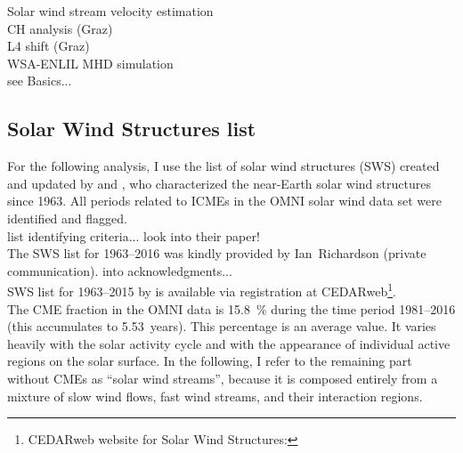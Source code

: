 Solar wind stream velocity estimation\\
CH analysis (Graz)\\
L4 shift (Graz)\\
WSA-ENLIL MHD simulation\\
see Basics...\\

\subsection{Solar Wind Structures list}
For the following analysis, I use the list of solar wind structures (SWS) created and updated by \citet{Richardson2000} and \citet{Richardson2012}, who characterized the near-Earth solar wind structures since 1963. All periods related to ICMEs in the OMNI solar wind data set were identified and flagged.\\

list identifying criteria... look into their paper!\\

The SWS list for 1963--2016 was kindly provided by Ian~Richardson (private communication). into acknowledgments...\\

SWS list for 1963--2015 by \citep{Richardson2000,Richardson2012} is available via registration at CEDARweb\footnote{CEDARweb website for Solar Wind Structures: }.\\

The CME fraction in the OMNI data is \SI{15.8}{\%} during the time period 1981--2016 (this accumulates to 5.53~years).
This percentage is an average value. It varies heavily with the solar activity cycle and with the appearance of individual active regions on the solar surface. In the following, I refer to the remaining part without CMEs as ``solar wind streams'', because it is composed entirely from a mixture of slow wind flows, fast wind streams, and their interaction regions.

